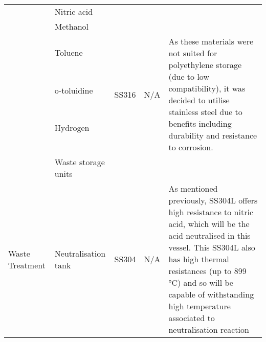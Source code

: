 \begin{table}[H]
\begin{tabular}{@{}p{3cm}|p{3cm}|p{3cm}|p{3cm}|p{3cm}@{}}
                                                      & Nitric acid                         &                                                                                               &                                                    &            \\
                                                      & Methanol                            &                                                 &                              & \\
                                                      & Toluene                                                  &    \multirow{4}{*}{SS316} & \multirow{4}{*}{N/A}                                                       &  \multirow{4}{*}{As these materials were not suited for polyethylene storage (due to low compatibility), it was decided to utilise stainless steel due to benefits including durability and resistance to corrosion.}                                         \\
                                                      & o-toluidine                                              &                                                                                               &                                                    &      \\
                                                      & Hydrogen                                                 &                                                                                               &                                                    &    \\
                                                      &                                                          &                                                                                               &                                                    &                                           \\ 
     & {Waste storage units}                    &                                                                   &                            &                                                                                                                                                         \\ \midrule
    \multirow{3}{*}{Waste Treatment}           & Neutralisation tank                 & SS304              & N/A                                                & As   mentioned previously, SS304L offers high resistance to nitric acid, which   will be the acid neutralised in this vessel. This SS304L also has high   thermal resistances (up to 899 °C) and so will be capable of withstanding high   temperature associated to neutralisation reaction                                                                \\

\end{tabular}
\end{table}

